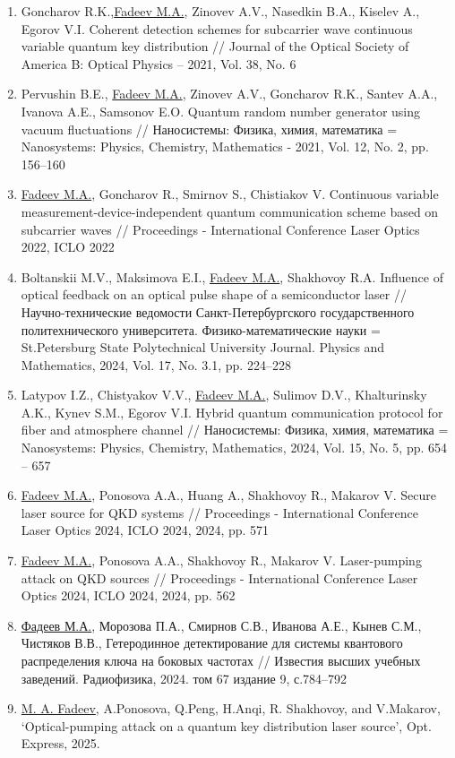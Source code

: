\begin{enumerate}
    \item Goncharov R.K.,\underline{Fadeev M.A.}, Zinovev A.V., Nasedkin B.A., Kiselev A., Egorov V.I. Coherent detection schemes for subcarrier wave continuous variable quantum key distribution // Journal of the Optical Society of America B: Optical Physics -- 2021, Vol. 38, No. 6
    \item Pervushin B.E., \underline{Fadeev M.A.}, Zinovev A.V., Goncharov R.K., Santev A.A., Ivanova A.E., Samsonov E.O. Quantum random number generator using vacuum fluctuations // Наносистемы: Физика, химия, математика = Nanosystems: Physics, Chemistry, Mathematics - 2021, Vol. 12, No. 2, pp. 156--160
    \item \underline{Fadeev M.A.}, Goncharov R., Smirnov S., Chistiakov V. Continuous variable measurement-device-independent quantum communication scheme based on subcarrier waves // Proceedings - International Conference Laser Optics 2022, ICLO 2022
    \item Boltanskii M.V., Maksimova E.I., \underline{Fadeev M.A.}, Shakhovoy R.A. Influence of optical feedback on an optical pulse shape of a semiconductor laser // Научно-технические ведомости Санкт-Петербургского государственного политехнического университета. Физико-математические науки = St.Petersburg State Polytechnical University Journal. Physics and Mathematics, 2024, Vol. 17, No. 3.1, pp. 224--228
    \item Latypov I.Z., Chistyakov V.V., \underline{Fadeev M.A.}, Sulimov D.V., Khalturinsky A.K., Kynev S.M., Egorov V.I. Hybrid quantum communication protocol for fiber and atmosphere channel // Наносистемы: Физика, химия, математика = Nanosystems: Physics, Chemistry, Mathematics, 2024, Vol. 15, No. 5, pp. 654 -- 657
    \item \underline{Fadeev M.A.}, Ponosova A.A., Huang A., Shakhovoy R., Makarov V. Secure laser source for QKD systems // Proceedings - International Conference Laser Optics 2024, ICLO 2024, 2024, pp. 571
    \item \underline{Fadeev M.A.}, Ponosova A.A., Shakhovoy R., Makarov V. Laser-pumping attack on QKD sources // Proceedings - International Conference Laser Optics 2024, ICLO 2024, 2024, pp. 562
    \item \underline{Фадеев М.А.}, Морозова П.А., Смирнов С.В., Иванова А.Е., Кынев С.М., Чистяков В.В., Гетеродинное детектирование для системы квантового распределения ключа на боковых частотах // Известия высших учебных заведений. Радиофизика, 2024. том 67 издание 9, с.784--792
    \item \underline{M. A. Fadeev}, A.Ponosova, Q.Peng, H.Anqi, R. Shakhovoy, and V.Makarov, `Optical-pumping attack on a quantum key distribution laser source', Opt. Express, 2025.

\end{enumerate}
